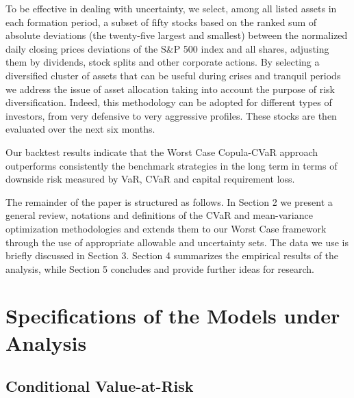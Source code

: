 \documentclass[a4paper,10pt]{article}
\begin{document}
To be effective in dealing with uncertainty, we select, among all listed assets in each formation period, a subset of fifty stocks based on the ranked sum of absolute deviations (the twenty-five largest and smallest) between the normalized daily closing prices deviations of the S\&P 500 index and all shares, adjusting them by dividends, stock splits and other corporate actions. By selecting a diversified cluster of assets that can be useful during crises and tranquil periods we address the issue of asset allocation taking into account the purpose of risk diversification. Indeed, this methodology can be adopted for different types of investors, from very defensive to very aggressive profiles. These stocks are then evaluated over the next six months.

 Our backtest results indicate
that the Worst Case Copula-CVaR approach outperforms consistently the
benchmark strategies in the long term in terms of downside risk measured by VaR, CVaR and capital requirement loss. 

The remainder of the paper is structured as follows. In Section 2 we present
a general review, notations and definitions of the CVaR and mean-variance
optimization methodologies and extends them to our Worst Case framework
through the use of appropriate allowable and uncertainty sets. The data we
use is briefly discussed in Section 3. Section 4 summarizes the empirical
results of the analysis, while Section 5 concludes and provide further ideas
for research.

\section{Specifications of the Models under Analysis}

\label{section2}

\subsection{Conditional Value-at-Risk}
\end{document}
